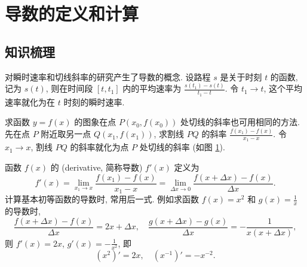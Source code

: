   \section{导数的定义和计算}

  \subsection{知识梳理}
  对瞬时速率和切线斜率的研究产生了导数的概念. 设路程 $s$ 是关于时刻 $t$ 的函数, 记为 $s(t)$, 则在时间段 $[t,t_1]$ 内的平均速率为 
  $\frac{s(t_1)-s(t)}{t_1-t}$. 令 $t_1\to t$, 这个平均速率就化为在 $t$ 时刻的瞬时速率. 
  
  求函数 $y=f(x)$ 的图象在点 $P(x_0,f(x_0))$ 处切线的斜率也可用相同的方法. 先在点 $P$ 附近取另一点 $Q(x_1,f(x_1))$, 求割线 $PQ$ 的斜率 
  $\frac{f(x_1)-f(x)}{x_1-x}$. 令 $x_1\to x$, 割线 $PQ$ 的斜率就化为点 $P$ 处切线的斜率 (如图 \ref{fig-191127-2145}). 
  \begin{figure}[htb]
    \small
    \centering
    \caption{}\label{fig-191127-2145}
  \end{figure}

  函数 $f(x)$ 的 (derivative, 简称导数) $f'(x)$ 定义为
  \[f'(x)=\lim_{x_1\to x} \frac{f(x_1)-f(x)}{x_1-x}
    = \lim_{\Delta x\to 0} \frac{f(x+\Delta x)-f(x)}{\Delta x}.\]
  计算基本初等函数的导数时, 常用后一式. 例如求函数 $f(x)=x^2$ 和 $g(x)= \frac1x$ 的导数时,
  \[\frac{f(x+\Delta x)-f(x)}{\Delta x}= 2x+\Delta x,\quad
    \frac{g(x+\Delta x)-g(x)}{\Delta x}= -\frac1{x(x+\Delta x)},\]
  则 $f'(x)=2x$, $g'(x)= -\frac1{x^2}$, 即
    \[(x^2)'=2x,\quad (x^{-1})'=-x^{-2}.\]

